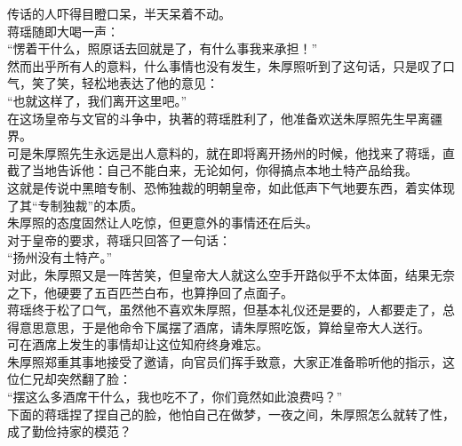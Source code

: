 \begin{multicols}{\theparacolNo}
传话的人吓得目瞪口呆，半天呆着不动。\\

蒋瑶随即大喝一声：\\

“愣着干什么，照原话去回就是了，有什么事我来承担！”\\

然而出乎所有人的意料，什么事情也没有发生，朱厚照听到了这句话，只是叹了口气，笑了笑，轻松地表达了他的意见：\\

“也就这样了，我们离开这里吧。”\\

在这场皇帝与文官的斗争中，执著的蒋瑶胜利了，他准备欢送朱厚照先生早离疆界。\\

可是朱厚照先生永远是出人意料的，就在即将离开扬州的时候，他找来了蒋瑶，直截了当地告诉他：自己不能白来，无论如何，你得搞点本地土特产品给我。\\

这就是传说中黑暗专制、恐怖独裁的明朝皇帝，如此低声下气地要东西，着实体现了其“专制独裁”的本质。\\

朱厚照的态度固然让人吃惊，但更意外的事情还在后头。\\

对于皇帝的要求，蒋瑶只回答了一句话：\\

“扬州没有土特产。”\\

对此，朱厚照又是一阵苦笑，但皇帝大人就这么空手开路似乎不太体面，结果无奈之下，他硬要了五百匹苎白布，也算挣回了点面子。\\

蒋瑶终于松了口气，虽然他不喜欢朱厚照，但基本礼仪还是要的，人都要走了，总得意思意思，于是他命令下属摆了酒席，请朱厚照吃饭，算给皇帝大人送行。\\

可在酒席上发生的事情却让这位知府终身难忘。\\

朱厚照郑重其事地接受了邀请，向官员们挥手致意，大家正准备聆听他的指示，这位仁兄却突然翻了脸：\\

“摆这么多酒席干什么，我也吃不了，你们竟然如此浪费吗？”\\

下面的蒋瑶捏了捏自己的脸，他怕自己在做梦，一夜之间，朱厚照怎么就转了性，成了勤俭持家的模范？\\


\end{multicols}

